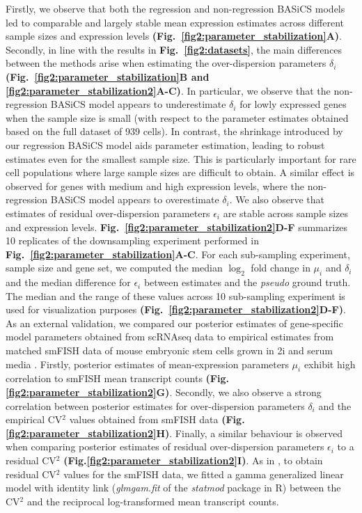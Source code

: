 Firstly, we observe that both the regression and non-regression BASiCS models led to comparable and largely stable mean expression estimates across different sample sizes and expression levels \textbf{(Fig.~\ref{fig2:parameter_stabilization}A)}. Secondly, in line with the results in \textbf{Fig.~\ref{fig2:datasets}}, the main differences between the methods arise when estimating the over-dispersion parameters $\delta_i$ \textbf{(Fig.~\ref{fig2:parameter_stabilization}B and \ref{fig2:parameter_stabilization2}A-C)}. In particular, we observe that the non-regression BASiCS model appears to underestimate $\delta_i$ for lowly expressed genes when the sample size is small (with respect to the parameter estimates obtained based on the full dataset of 939 cells). In contrast, the shrinkage introduced by our regression BASiCS model aids parameter estimation, leading to robust estimates even for the smallest sample size. This is particularly important for rare cell populations where large sample sizes are difficult to obtain. A similar effect is observed for genes with medium and high expression levels, where the non-regression BASiCS model appears to overestimate $\delta_i$. We also observe that estimates of residual over-dispersion parameters $\epsilon_i$ are stable across sample sizes and expression levels. \textbf{Fig.~\ref{fig2:parameter_stabilization2}D-F} summarizes 10 replicates of the downsampling experiment performed in \textbf{Fig.~\ref{fig2:parameter_stabilization}A-C}. For each sub-sampling experiment, sample size and gene set, we computed the median $\log_2$ fold change in $\mu_i$ and $\delta_i$ and the median difference for $\epsilon_i$ between estimates and the \emph{pseudo} ground truth. The median and the range of these values across 10 sub-sampling experiment is used for visualization purposes \textbf{(Fig.~\ref{fig2:parameter_stabilization2}D-F)}. \\

As an external validation, we compared our posterior estimates of gene-specific model parameters obtained from scRNAseq data to empirical estimates from matched smFISH data of mouse embryonic stem cells grown in 2i and serum media \citep{Grun2014}. Firstly, posterior estimates of mean-expression parameters $\mu_i$ exhibit high correlation to smFISH mean transcript counts \textbf{(Fig.\ref{fig2:parameter_stabilization2}G)}. Secondly, we also observe a strong correlation between posterior estimates for over-dispersion parameters $\delta_i$ and the empirical CV$^2$ values obtained from smFISH data \textbf{(Fig.\ref{fig2:parameter_stabilization2}H)}. Finally, a similar behaviour is observed when comparing posterior estimates of residual over-dispersion parameters $\epsilon_i$ to a residual CV$^2$ \textbf{(Fig.\ref{fig2:parameter_stabilization2}I)}. As in \cite{Brennecke2013}, to obtain residual CV$^2$ values for the smFISH data, we fitted a gamma generalized linear model with identity link (\textit{glmgam.fit} of the \textit{statmod} package in R) between the CV$^2$ and the reciprocal log-transformed mean transcript counts.


